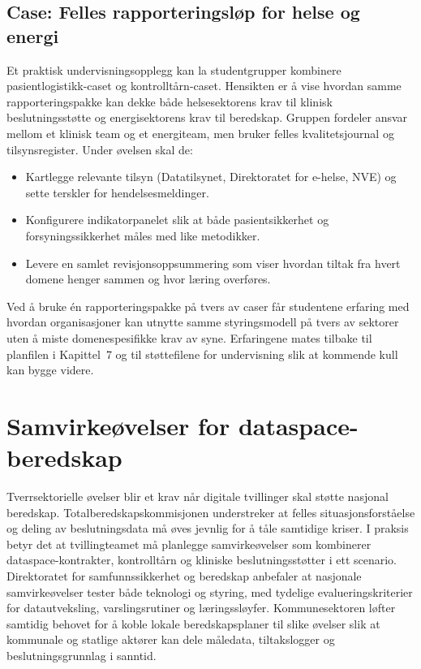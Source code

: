 \subsection{Case: Felles rapporteringsløp for helse og energi}
Et praktisk undervisningsopplegg kan la studentgrupper kombinere pasientlogistikk-caset og kontrolltårn-caset. Hensikten er å vise hvordan samme rapporteringspakke kan dekke både helsesektorens krav til klinisk beslutningsstøtte og energisektorens krav til beredskap. Gruppen fordeler ansvar mellom et klinisk team og et energiteam, men bruker felles kvalitetsjournal og tilsynsregister. Under øvelsen skal de:
\begin{itemize}
    \item Kartlegge relevante tilsyn (Datatilsynet, Direktoratet for e-helse, NVE) og sette terskler for hendelsesmeldinger.
    \item Konfigurere indikatorpanelet slik at både pasientsikkerhet og forsyningssikkerhet måles med like metodikker.
    \item Levere en samlet revisjonsoppsummering som viser hvordan tiltak fra hvert domene henger sammen og hvor læring overføres.
\end{itemize}

Ved å bruke én rapporteringspakke på tvers av caser får studentene erfaring med hvordan organisasjoner kan utnytte samme styringsmodell på tvers av sektorer uten å miste domenespesifikke krav av syne. Erfaringene mates tilbake til planfilen i Kapittel~7 og til støttefilene for undervisning slik at kommende kull kan bygge videre.

\section{Samvirkeøvelser for dataspace-beredskap}
Tverrsektorielle øvelser blir et krav når digitale tvillinger skal støtte nasjonal beredskap. Totalberedskapskommisjonen understreker at felles situasjonsforståelse og deling av beslutningsdata må øves jevnlig for å tåle samtidige kriser.\citep{dsb2023totalberedskap} I praksis betyr det at tvillingteamet må planlegge samvirkeøvelser som kombinerer dataspace-kontrakter, kontrolltårn og kliniske beslutningsstøtter i ett scenario. Direktoratet for samfunnssikkerhet og beredskap anbefaler at nasjonale samvirkeøvelser tester både teknologi og styring, med tydelige evalueringskriterier for datautveksling, varslingsrutiner og læringssløyfer.\citep{dsb2024nser} Kommunesektoren løfter samtidig behovet for å koble lokale beredskapsplaner til slike øvelser slik at kommunale og statlige aktører kan dele måledata, tiltakslogger og beslutningsgrunnlag i sanntid.\citep{ks2022samhandling}

